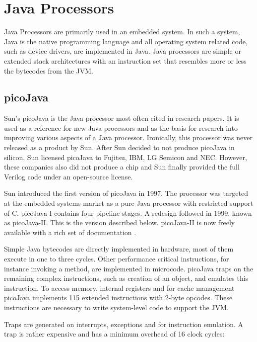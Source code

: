 \section{Java Processors}

Java Processors are primarily used in an embedded system. In such a
system, Java is the native programming language and all operating
system related code, such as device drivers, are implemented in
Java. Java processors are simple or extended stack architectures
with an instruction set that resembles more or less the bytecodes
from the JVM.

\subsection{picoJava}
\label{subsec:related:picojava}

Sun's picoJava is the Java processor most often cited in research
papers. It is used as a reference for new Java processors and as the
basis for research into improving various aspects of a Java
processor. Ironically, this processor was never released as a
product by Sun. After Sun decided to not produce picoJava in
silicon, Sun licensed picoJava to Fujitsu, IBM, LG Semicon and NEC.
However, these companies also did not produce a chip and Sun finally
provided the full Verilog code under an open-source license.

Sun introduced the first version of picoJava \cite{624084} in 1997.
The processor was targeted at the embedded systems market as a pure
Java processor with restricted support of C. picoJava-I contains
four pipeline stages. A redesign followed in 1999, known as
picoJava-II. This is the version described below. picoJava-II is now
freely available with a rich set of documentation \cite{pjMicroArch,
pjProgRef}.

Simple Java bytecodes are directly implemented in hardware, most of
them execute in one to three cycles. Other performance critical
instructions, for instance invoking a method, are implemented in
microcode. picoJava traps on the remaining complex instructions,
such as creation of an object, and emulates this instruction. To
access memory, internal registers and for cache management picoJava
implements 115 extended instructions with 2-byte opcodes. These
instructions are necessary to write system-level code to support the
JVM.

Traps are generated on interrupts, exceptions and for instruction
emulation. A trap is rather expensive and has a minimum overhead of
16 clock cycles:

